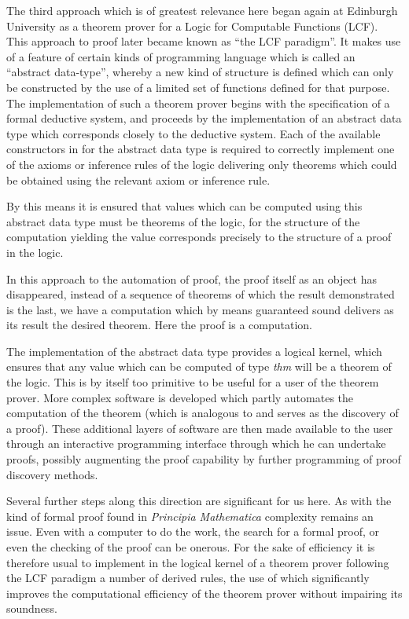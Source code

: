 The third approach which is of greatest relevance here began again at
Edinburgh University as a theorem prover for a Logic for Computable
Functions (LCF).
This approach to proof later became known as ``the LCF
paradigm''.
It makes use of a feature of certain kinds of programming language
which is called an ``abstract data-type'', whereby a new kind of
structure is defined which can only be constructed by the use of a
limited set of functions defined for that purpose.
The implementation of such a theorem prover begins with the
specification of a formal deductive system, and proceeds by the
implementation of an abstract data type which corresponds closely to
the deductive system.
Each of the available constructors in for the abstract data type is
required to correctly implement one of the axioms or inference rules
of the logic delivering only theorems which could be obtained using
the relevant axiom or inference rule.

By this means it is ensured that values which can be computed using
this abstract data type must be theorems of the logic, for the
structure of the computation yielding the value corresponds precisely
to the structure of a proof in the logic.

In this approach to the automation of proof, the proof itself as an
object has disappeared, instead of a sequence of theorems of which the
result demonstrated is the last, we have a computation which by means
guaranteed sound delivers as its result the desired theorem.
Here the proof is a computation.

The implementation of the abstract data type provides a logical
kernel, which ensures that any value which can be computed of type
\emph{thm} will be a theorem of the logic.
This is by itself too primitive to be useful for a user of the theorem
prover.
More complex software is developed which partly automates the
computation of the theorem (which is analogous to and serves as the
discovery of a proof).
These additional layers of software are then made available to the
user through an interactive programming interface through which he can
undertake proofs, possibly augmenting the proof capability by further
programming of proof discovery methods.

Several further steps along this direction are significant for us
here.
As with the kind of formal proof found in \emph{Principia Mathematica}
complexity remains an issue.
Even with a computer to do the work, the search for a formal proof, or
even the checking of the proof can be onerous.
For the sake of efficiency it is therefore usual to implement in the
logical kernel of a theorem prover following the LCF paradigm a number
of derived rules, the use of which significantly improves the
computational efficiency of the theorem prover without impairing its
soundness. 

